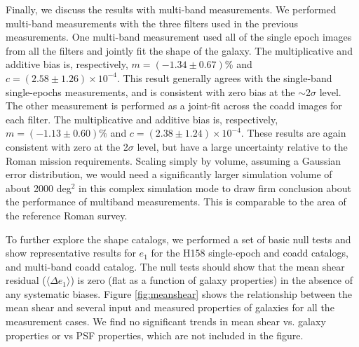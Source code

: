 \documentclass[fleqn,usenatbib]{mnras}
\begin{document}
Finally, we discuss the results with multi-band measurements. We performed multi-band measurements with the three filters used in the previous measurements. One multi-band measurement used all of the single epoch images from all the filters and jointly fit the shape of the galaxy. The multiplicative and additive bias is, respectively, $m=(-1.34\pm0.67)$\% and $c=(2.58\pm1.26)\times10^{-4}$. This result generally agrees with the single-band single-epochs measurements, and is consistent with zero bias at the $\sim$2$\sigma$ level. The other measurement is performed as a joint-fit across the coadd images for each filter. The multiplicative and additive bias is, respectively, $m=(-1.13\pm0.60)\%$ and $c=(2.38\pm1.24)\times10^{-4}$. These results are again consistent with zero at the 2$\sigma$ level, but have a large uncertainty relative to the Roman mission requirements. Scaling simply by volume, assuming a Gaussian error distribution, we would need a significantly larger simulation volume of about 2000 \textrm{deg}$^2$ in this complex simulation mode to draw firm conclusion about the performance of multiband measurements. This is comparable to the area of the reference Roman survey.

To further explore the shape catalogs, we performed a set of basic null tests and show representative results for $e_1$ for the H158 single-epoch and coadd catalogs, and multi-band coadd catalog. The null tests should show that the mean shear residual ($\langle \Delta e_{1} \rangle$) is zero (flat as a function of galaxy properties) in the absence of any systematic biases. Figure \ref{fig:meanshear} shows the relationship between the mean shear and several input and measured properties of galaxies for all the measurement cases. We find no significant trends in mean shear vs. galaxy properties or vs PSF properties, which are not included in the figure. 
\end{document}
